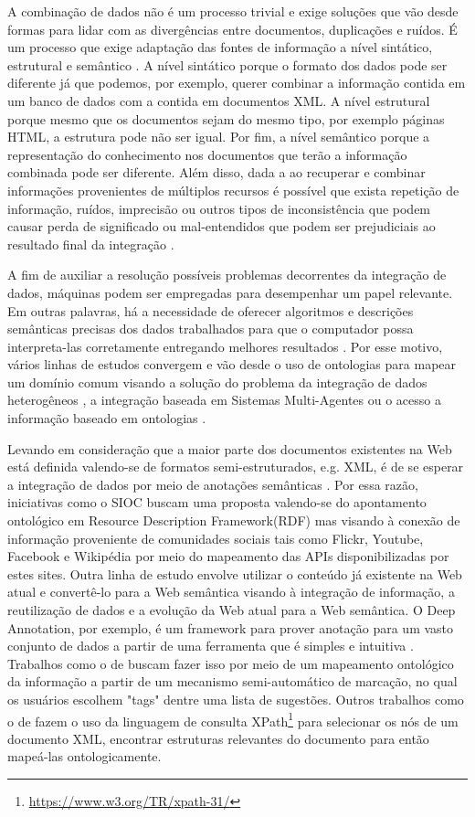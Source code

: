 A combinação de dados não é um processo trivial e exige soluções que vão desde formas para lidar com as divergências entre documentos, duplicações e ruídos. É um processo que exige adaptação das fontes de informação a nível sintático, estrutural e semântico \citep{Vettor2014}. A nível sintático porque o formato dos dados pode ser diferente já que podemos, por exemplo, querer combinar a informação contida em um banco de dados com a contida em documentos XML. A nível estrutural porque mesmo que os documentos sejam do mesmo tipo, por exemplo páginas HTML, a estrutura pode não ser igual. Por fim, a nível semântico porque a representação do conhecimento nos documentos que terão a informação combinada pode ser diferente. Além disso, dada a ao recuperar e combinar informações provenientes de múltiplos recursos é possível que exista repetição de informação, ruídos, imprecisão ou outros tipos de inconsistência que podem causar perda de significado ou mal-entendidos que podem ser prejudiciais ao resultado final da integração \citep{Vettor2014}.

A fim de auxiliar a resolução possíveis problemas decorrentes da integração de dados, máquinas podem ser empregadas para desempenhar um papel relevante. Em outras palavras, há a necessidade de oferecer algoritmos e descrições semânticas precisas dos dados trabalhados para que o computador possa interpreta-las corretamente entregando melhores resultados \citep{Vettor2014}. Por esse motivo, vários linhas de estudos convergem e vão desde o uso de ontologias para mapear um domínio comum visando a solução do problema da integração de dados heterogêneos \citep{Ahmed2008}, a integração baseada em Sistemas Multi-Agentes \citep{Sui2009} ou o acesso a informação baseado em ontologias \citep{Civili2013, Lembo2014, Kharlamov2013}. 

Levando em consideração que a maior parte dos documentos existentes na Web está definida valendo-se de formatos semi-estruturados, e.g. XML, é de se esperar a integração de dados por meio de anotações semânticas \citep{May}. Por essa razão, iniciativas como o SIOC \citep{Bojars2008} buscam uma proposta valendo-se do apontamento ontológico em Resource Description Framework(RDF) \citep{RDFWorkingGroup2014} mas visando à conexão de informação proveniente de comunidades sociais tais como Flickr, Youtube, Facebook e Wikipédia por meio do mapeamento das APIs disponibilizadas por estes sites. Outra linha de estudo envolve utilizar o conteúdo já existente na Web atual e convertê-lo para a Web semântica visando à integração de informação, a reutilização de dados e a evolução da Web atual para a Web semântica. O Deep Annotation, por exemplo, é um framework para prover anotação para um vasto conjunto de dados a partir de uma ferramenta que é simples e intuitiva \citep{Handschuh2003}. Trabalhos como o de \citep{AndreasHess} buscam fazer isso por meio de um mapeamento ontológico da informação a partir de um mecanismo semi-automático de marcação, no qual os usuários escolhem "tags" dentre uma lista de sugestões. Outros trabalhos como o de \citep{May} fazem o uso da linguagem de consulta XPath\footnote{\url{https://www.w3.org/TR/xpath-31/}} para selecionar os nós de um documento XML, encontrar estruturas relevantes do documento para então mapeá-las ontologicamente.

